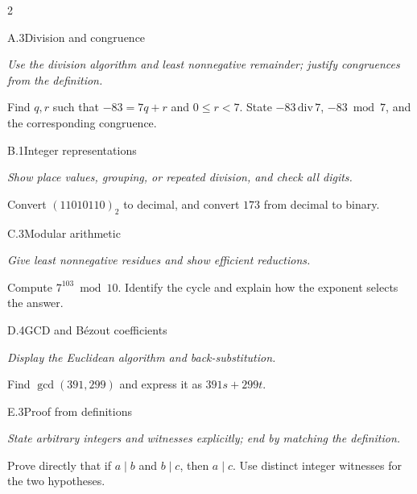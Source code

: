 \documentclass[9pt]{extarticle}
\begin{document}
\begin{multicols}{2}
\begin{CoreProblem}{A.3}{Division and congruence}
{\scriptsize\textit{Use the division algorithm and least nonnegative remainder; justify congruences from the definition.}\par}
Find $q,r$ such that $-83=7q+r$ and $0\le r<7$. State
$-83\,\mathrm{div}\,7$, $-83\bmod7$, and the corresponding congruence.
\end{CoreProblem}
\begin{CoreProblem}{B.1}{Integer representations}
{\scriptsize\textit{Show place values, grouping, or repeated division, and check all digits.}\par}
Convert $(11010110)_2$ to decimal, and convert $173$ from decimal to binary.
\end{CoreProblem}
\begin{CoreProblem}{C.3}{Modular arithmetic}
{\scriptsize\textit{Give least nonnegative residues and show efficient reductions.}\par}
Compute $7^{103}\bmod10$. Identify the cycle and explain how the exponent
selects the answer.
\end{CoreProblem}
\columnbreak
\begin{CoreProblem}{D.4}{GCD and B\'ezout coefficients}
{\scriptsize\textit{Display the Euclidean algorithm and back-substitution.}\par}
Find $\gcd(391,299)$ and express it as $391s+299t$.
\end{CoreProblem}
\begin{CoreProblem}{E.3}{Proof from definitions}
{\scriptsize\textit{State arbitrary integers and witnesses explicitly; end by matching the definition.}\par}
Prove directly that if $a\mid b$ and $b\mid c$, then $a\mid c$. Use distinct
integer witnesses for the two hypotheses.
\end{CoreProblem}
\end{multicols}
\CoreWorkArea
\FormBreak
{}
\end{document}
